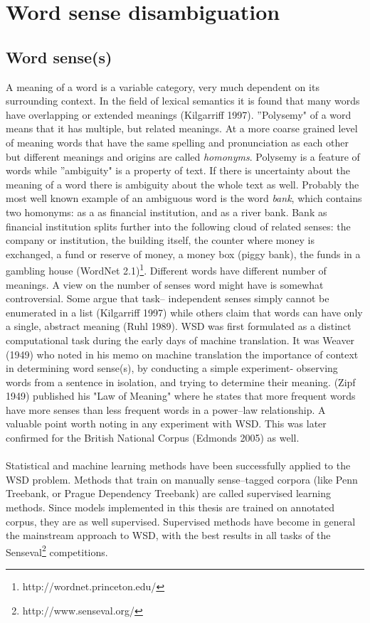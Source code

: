 \chapter{Word sense disambiguation}
\section{Word sense(s)}
A meaning of a word is a variable category, very much dependent on its surrounding context. In the field 
of lexical semantics it is found that many words have overlapping or extended meanings (Kilgarriff 
1997). ''Polysemy" of a word means that it has multiple, but related meanings. At a 
more coarse grained level of meaning words that have the same spelling and pronunciation as each other but different meanings and origins are called \textit{homonyms}. Polysemy is a 
feature of words while ''ambiguity" is a property of text. If there is uncertainty about  the meaning of a 
word there is ambiguity about the whole text as well. 
Probably the most well known example of an ambiguous word is the word \textit{bank}, which contains
two homonyms: as a  as financial institution, and as a river bank. Bank as financial institution splits 
further into the following cloud of related senses: the company or institution, the building itself, the 
counter where money is exchanged, a fund or reserve of money, a money box (piggy bank), the funds in 
a gambling house (WordNet 2.1)\footnote{http://wordnet.princeton.edu/}.
Different words have different number of meanings.
A view on the number of senses word might have is somewhat controversial. Some argue that task--
independent senses simply cannot be enumerated in a list (Kilgarriff 1997) while 
others claim that words can have only a single, abstract meaning (Ruhl 1989).
\newline
\newline 
WSD was first formulated as a distinct computational task during the early days of machine translation. It was Weaver
 (1949) who noted in his memo on machine translation the importance of context in determining word sense(s), by conducting a simple experiment- observing words from a sentence in isolation, and trying to determine their meaning. (Zipf 
1949) published his "Law of Meaning"  where he states  that more frequent words 
have more senses than less frequent words in a power--law relationship. A valuable point worth noting 
in any experiment with WSD. This was later confirmed for the British National Corpus (Edmonds 2005) 
 as well.
\\\\  
Statistical and machine learning methods have been successfully applied to the WSD problem. Methods that train on manually sense--tagged corpora (like Penn Treebank, or Prague Dependency Treebank) are called supervised learning methods. Since models implemented in this thesis are trained on annotated corpus, they are as well supervised. Supervised methods have become in general the mainstream approach to WSD, with the best results in all tasks of the Senseval\footnote{http://www.senseval.org/} competitions.


